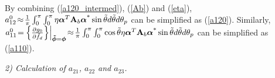 \documentclass[12pt, draftclsnofoot, onecolumn]{IEEEtran}
\begin{document}
By combining (\ref{a120_intermed}), (\ref{Ab}) and (\ref{eta}), $a_{12}^{0} \!\approx\! \frac{1}{{ \rm{\pi} }}\int_{0}^{{ \rm{\pi} }}{\int_{0}^{ \rm{\pi} } {{\eta }{{\boldsymbol{\alpha }}^{T}}{{\mathbf{A}}_{b}}{{\boldsymbol{\alpha }}^{\text{*}}}\sin \tilde{\theta }d\tilde{\theta }}d{{\theta }_{p}}}$ can be simplified as (\ref{a120}).
Similarly, $a_{11}^{0} \!=\! {{\left. \left\{ \frac{\partial {{g}_{0}}}{\partial {{{\tilde{f}}}_{d}}}  \right\} \right|}_{\boldsymbol{\tilde{\phi}} = \boldsymbol{\phi} }} \!\approx\! \frac{1}{{ \rm{\pi} }}\int_{0}^{ \rm{\pi} }{\int_{0}^{ \rm{\pi} }{\cos \tilde{\theta } {\eta }{{\boldsymbol{\alpha }}^{T}}{{\mathbf{A}}_{b}}{{\boldsymbol{\alpha }}^{\text{*}}}\sin \tilde{\theta }d\tilde{\theta }}d{{\theta }_{p}}}$ can be simplified as (\ref{a110}).

\emph{2) Calculation of $a_{21}$, $a_{22}$ and $a_{23}$.}
\end{document}
